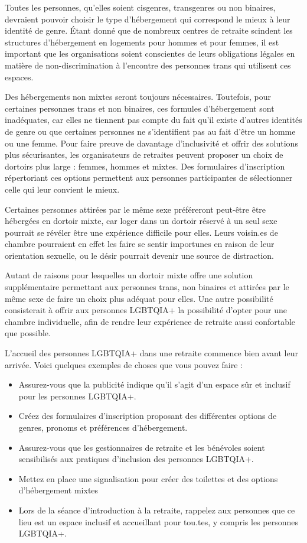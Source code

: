 \documentclass[12pt,openany]{book}
\begin{document}
Toutes les personnes, qu’elles soient cisgenres, transgenres ou non binaires, devraient pouvoir choisir le type d’hébergement qui correspond le mieux à leur identité de genre.
Étant donné que de nombreux centres de retraite scindent les structures d’hébergement en logements pour hommes et pour femmes, il est important que les organisations soient conscientes de leurs obligations légales en matière de non-discrimination à l’encontre des personnes trans qui utilisent ces espaces.

Des hébergements non mixtes seront toujours nécessaires. Toutefois, pour certaines personnes trans et non binaires, ces formules d’hébergement sont inadéquates, car elles ne tiennent pas compte du fait qu’il existe d’autres identités de genre ou que certaines personnes ne s’identifient pas au fait d’être un homme ou une femme. Pour faire preuve de davantage d’inclusivité et offrir des solutions plus sécurisantes, les organisateurs de retraites peuvent proposer un choix de dortoirs plus large : femmes, hommes et mixtes. Des formulaires d’inscription répertoriant ces options permettent aux personnes participantes de sélectionner celle qui leur convient le mieux.

Certaines personnes attirées par le même sexe préféreront peut-être être hébergées en dortoir mixte, car loger dans un dortoir réservé à un seul sexe pourrait se révéler être une expérience difficile pour elles. Leurs voisin.es de chambre pourraient en effet les faire se sentir importunes en raison de leur orientation sexuelle, ou le désir pourrait devenir une source de distraction.

Autant de raisons pour lesquelles un dortoir mixte offre une solution supplémentaire permettant aux personnes trans, non binaires et attirées par le même sexe de faire un choix plus adéquat pour elles. Une autre possibilité consisterait à offrir aux personnes \mbox{LGBTQIA+} la possibilité d’opter pour une chambre individuelle, afin de rendre leur expérience de retraite aussi confortable que possible.

L’accueil des personnes \mbox{LGBTQIA+} dans une retraite commence bien avant leur arrivée. Voici quelques exemples de choses que vous pouvez faire :

\begin{itemize}[label=\textbullet]
  \setlength\itemsep{-0.3em}
  \item Assurez-vous que la publicité indique qu’il s’agit d’un espace sûr et inclusif pour les personnes \mbox{LGBTQIA+}.
  \item Créez des formulaires d’inscription proposant des différentes options de genres, pronoms et préférences d’hébergement.
  \item Assurez-vous que les gestionnaires de retraite et les bénévoles soient sensibilisés aux pratiques d’inclusion des personnes \mbox{LGBTQIA+}.
  \item Mettez en place une signalisation pour créer des toilettes et des options d’hébergement mixtes
  \item Lors de la séance d’introduction à la retraite, rappelez aux personnes que ce lieu est un espace inclusif et accueillant pour tou.tes, y compris les personnes \mbox{LGBTQIA+}.
\end{itemize}
\end{document}
